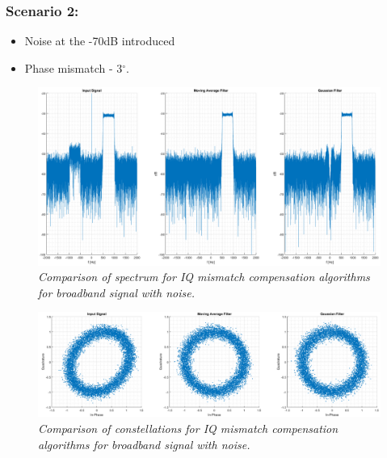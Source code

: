 \documentclass[en,printmode]{mgr}
\begin{document}
		\subsubsection*{Scenario 2:}
			\begin{itemize}
				\item Noise at the -70dB introduced
				\item Phase mismatch - 3$^\circ$.
			\end{itemize}
			\begin{figure}[!htb]
    			\centering
   				\includegraphics[width=\textwidth]{plots/band_nf.png}
   		 		\caption{\textit{Comparison of spectrum for IQ mismatch compensation algorithms for
   		 		broadband signal with noise.}}
   		 	\end{figure}	
   		 	\begin{figure}[!htb]
    			\centering
   				\includegraphics[width=\textwidth]{plots/band_nc.png}
   		 		\caption{\textit{Comparison of constellations for IQ mismatch compensation algorithms 
   		 		for broadband signal with noise.}}
   		 	\end{figure}
   		 	
\end{document}
